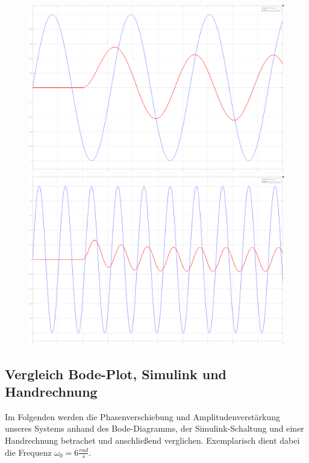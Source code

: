  \begin{figure}[H]
    \centering
    \begin{minipage}{.5\textwidth}
      \centering
      \includegraphics[width=0.9\linewidth]{Bilder/SimulinkOmega2.png}
    \end{minipage}%
    \begin{minipage}{.5\textwidth}
      \centering
      \includegraphics[width=0.9\linewidth]{Bilder/SimulinkOmega6.png}
    \end{minipage}
\end{figure}

\subsection{Vergleich Bode-Plot, Simulink und Handrechnung}
Im Folgenden werden die Phasenverschiebung und Amplitudenverstärkung unseres Systems anhand des Bode-Diagramms, der Simulink-Schaltung und einer Handrechnung betrachet und anschließend verglichen. Exemplarisch dient dabei die Frequenz $\omega_0 = 6 \frac{rad}{s}$.

